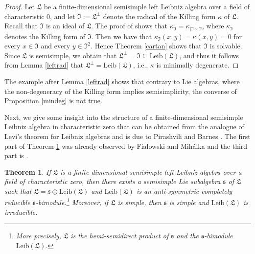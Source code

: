 \documentclass{amsart}
\newtheorem{thm}{Theorem}[section]
\numberwithin{equation}{section}
\newcommand{\leib}{\mathrm{Leib}}
\newcommand{\ssf}{\mathfrak{s}}
\newcommand{\lf}{\mathfrak{L}}
\newcommand{\If}{\mathfrak{I}}
\begin{document}
\begin{proof}
Let $\lf$ be a finite-dimensional semisimple left Leibniz algebra over a field of characteristic $0$,
and let $\If:=\lf^\perp$ denote the radical of the Killing form $\kappa$ of $\lf$. Recall that $\If$
is an ideal of $\lf$. The proof of \cite[Lemma 5.1]{H} shows that $\kappa_\If=\kappa_{\vert\If
\times\If}$, where $\kappa_\If$ denotes the Killing form of $\If$. Then we have that $\kappa_\If
(x,y)=\kappa(x,y)=0$ for every $x\in\If$ and every $y\in\If^2$. Hence Theorem \ref{cartan}
shows that $\If$ is solvable. Since $\lf$ is semisimple, we obtain that $\lf^\perp=\If\subseteq
\leib(\lf)$, and thus it follows from Lemma \ref{leftrad} that $\lf^\perp=\leib(\lf)$, i.e., $\kappa$
is minimally degenerate.
\end{proof}
\vspace{-.1cm}

 The example after Lemma \ref{leftrad} shows that contrary to
Lie algebras, where the non-degeneracy of the Killing form implies semisimplicity, the
converse of Proposition \ref{mindeg} is not true.
\vspace{.2cm}

Next, we give some insight into the structure of a finite-dimensional semisimple Leibniz algebra
in characteristic zero that can be obtained from the analogue of Levi's theorem for Leibniz
algebras and is due to Pirashvili \cite[Proposition 2.4]{P} and Barnes \cite[Theorem 1]{B3}.
The first part of Theorem \ref{strucsemisim} was already observed by Fialowski and Mih\'alka
\cite[Corollary 2.14]{FM} and the third part is \cite[Theorem~3.1]{GVKO}.

\begin{thm}\label{strucsemisim}
If $\lf$ is a finite-dimensional semisimple left Leibniz algebra over a field of characteristic zero,
then there exists a semisimple Lie subalgebra $\ssf$ of $\lf$ such that $\lf=\ssf\oplus\leib(\lf)$
and $\leib(\lf)$ is an anti-symmetric completely reducible $\ssf$-bimodule.\footnote{More precisely,
$\lf$ is the hemi-semidirect product of $\ssf$ and the $\ssf$-bimodule $\leib(\lf)$.} Moreover, if
$\lf$ is simple, then $\ssf$ is simple and $\leib(\lf)$ is irreducible.
\end{thm}
\end{document}
